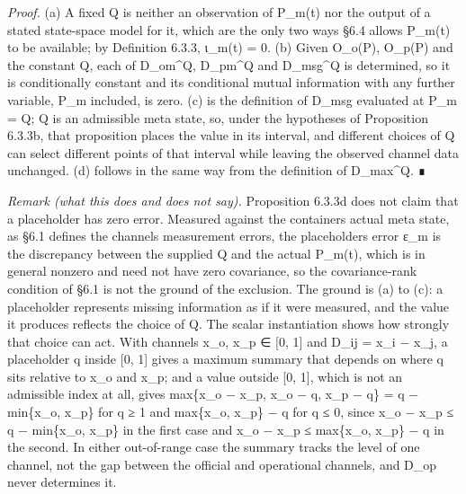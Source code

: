 \documentclass[
]{article}
\begin{document}
\emph{Proof.} (a) A fixed Q is neither an observation of P\_m(t) nor the
output of a stated state-space model for it, which are the only two ways
§6.4 allows P\_m(t) to be available; by Definition 6.3.3, ι\_m(t) = 0.
(b) Given O\_o(P), O\_p(P) and the constant Q, each of D\_om\^{}Q,
D\_pm\^{}Q and D\_msg\^{}Q is determined, so it is conditionally
constant and its conditional mutual information with any further
variable, P\_m included, is zero. (c) is the definition of D\_msg
evaluated at P\_m = Q; Q is an admissible meta state, so, under the
hypotheses of Proposition 6.3.3b, that proposition places the value in
its interval, and different choices of Q can select different points of
that interval while leaving the observed channel data unchanged. (d)
follows in the same way from the definition of D\_max\^{}Q. ∎

\emph{Remark (what this does and does not say).} Proposition 6.3.3d does
not claim that a placeholder has zero error. Measured against the
container\textquotesingle s actual meta state, as §6.1 defines the
channels\textquotesingle{} measurement errors, the
placeholder\textquotesingle s error ε\_m is the discrepancy between the
supplied Q and the actual P\_m(t), which is in general nonzero and need
not have zero covariance, so the covariance-rank condition of §6.1 is
not the ground of the exclusion. The ground is (a) to (c): a placeholder
represents missing information as if it were measured, and the value it
produces reflects the choice of Q. The scalar instantiation shows how
strongly that choice can act. With channels x\_o, x\_p ∈ {[}0, 1{]} and
D\_ij = \textbar x\_i − x\_j\textbar, a placeholder q inside {[}0, 1{]}
gives a maximum summary that depends on where q sits relative to x\_o
and x\_p; and a value outside {[}0, 1{]}, which is not an admissible
index at all, gives max\{\textbar x\_o − x\_p\textbar, \textbar x\_o −
q\textbar, \textbar x\_p − q\textbar\} = q − min\{x\_o, x\_p\} for q ≥ 1
and max\{x\_o, x\_p\} − q for q ≤ 0, since \textbar x\_o −
x\_p\textbar{} ≤ q − min\{x\_o, x\_p\} in the first case and
\textbar x\_o − x\_p\textbar{} ≤ max\{x\_o, x\_p\} − q in the second. In
either out-of-range case the summary tracks the level of one channel,
not the gap between the official and operational channels, and D\_op
never determines it.
\end{document}
